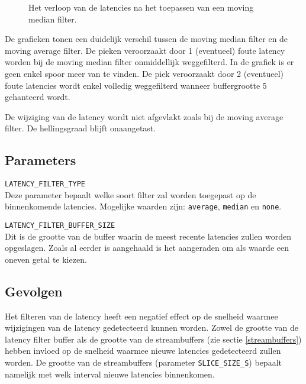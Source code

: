 \begin{figure}[!tbph]
	\centering
	\subfloat[Buffergrootte 3]{}
	\hfill
	\subfloat[Buffergrootte 5]{}
	\captionsetup{width=0.7\textwidth}
	\caption{Het verloop van de latencies na het toepassen van een moving median filter.}
\end{figure}

De grafieken tonen een duidelijk verschil tussen de moving median filter en de moving average filter. De pieken veroorzaakt door 1 (eventueel) foute latency worden bij de moving median filter onmiddellijk weggefilterd. In de grafiek is er geen enkel spoor meer van te vinden. De piek veroorzaakt door 2 (eventueel) foute latencies wordt enkel volledig weggefilterd wanneer buffergrootte 5 gehanteerd wordt.

De wijziging van de latency wordt niet afgevlakt zoals bij de moving average filter. De hellingsgraad blijft onaangetast.

\subsection{Parameters}

\begin{description}
	\item\texttt{LATENCY\_FILTER\_TYPE} \hfill \\
	Deze parameter bepaalt welke soort filter zal worden toegepast op de binnenkomende latencies. Mogelijke waarden zijn: \texttt{average}, \texttt{median} en \texttt{none}.
	
	\item\texttt{LATENCY\_FILTER\_BUFFER\_SIZE} \hfill \\
	Dit is de grootte van de buffer waarin de meest recente latencies zullen worden opgeslagen. Zoals al eerder is aangehaald is het aangeraden om als waarde een oneven getal te kiezen.

\end{description}

\subsection{Gevolgen}
\label{filter-gevolgen}

Het filteren van de latency heeft een negatief effect op de snelheid waarmee wijzigingen van de latency gedetecteerd kunnen worden. Zowel de grootte van de latency filter buffer als de grootte van de streambuffers (zie sectie \ref{streambuffers}) hebben invloed op de snelheid waarmee nieuwe latencies gedetecteerd zullen worden. De grootte van de streambuffers (parameter \texttt{SLICE\_SIZE\_S}) bepaalt namelijk met welk interval nieuwe latencies binnenkomen. 

